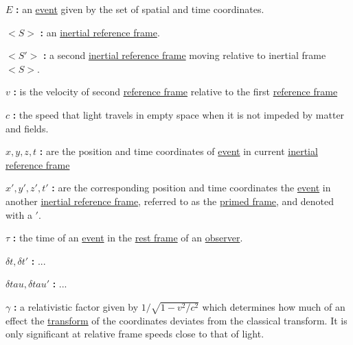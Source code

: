 \noindent \hypertarget{math-E}{$E$ \textbf{:}}
an \hyperlink{def-event}{event} given by the set of spatial and time coordinates. %

\noindent \hypertarget{math-S}{$<S>$ \textbf{:}}
an \hyperlink{def-Inertial-reference-frame}{inertial reference frame}.

\noindent \hypertarget{math-Sprime}{$<S'>$ \textbf{:}}
a second \hyperlink{def-Inertial-reference-frame}{inertial reference frame} moving relative to inertial frame $<S>$.

\noindent \hypertarget{math-v}{$v$ \textbf{:}}
is the velocity of second \hyperlink{def-Reference-frame}{reference frame} relative to the first \hyperlink{def-Reference-frame}{reference frame}

\noindent \hypertarget{math-c}{$c$ \textbf{:}}
the speed that light travels in empty space when it is not impeded by matter and fields.

\noindent \hypertarget{math-coords}{$x,y,z,t$ \textbf{:}}
are the position and time coordinates of \hyperlink{def-event}{event} in current \hyperlink{def-Inertial-reference-frame}{inertial reference frame}

\noindent \hypertarget{math-coords-prime}{$x',y',z',t'$ \textbf{:}}
are the corresponding position and time coordinates the \hyperlink{def-event}{event} in another \hyperlink{def-Inertial-reference-frame}{inertial reference frame}, referred to as the \hyperlink{def-Primed-Frame}{primed frame}, and denoted with a $'$.

\noindent \hypertarget{math-tau}{$\tau$ \textbf{:}}
the time of an \hyperlink{def-event}{event} in the \hyperlink{def-proper-frame}{rest frame} of an \hyperlink{def-observer}{observer}.

\noindent \hypertarget{math-delta-t,delta-t-prime}{$\delta t,\delta t'$ \textbf{:}}
...

\noindent \hypertarget{math-delta-tau,delta-tau-prime}{$\delta tau,\delta tau'$ \textbf{:}}
...

\noindent \hypertarget{math-gamma}{$\gamma$ \textbf{:}}
a relativistic factor given by $1/\sqrt{1-v^2/c^2}$ which determines how much of an effect the \hyperlink{def-transform}{transform} of the coordinates deviates from the classical transform. It is only significant at relative frame speeds close to that of light.
